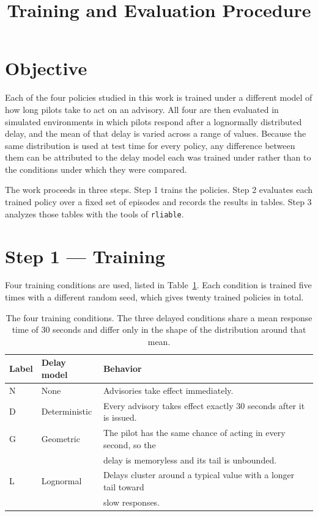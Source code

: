 \documentclass[11pt,a4paper]{article}
\title{Training and Evaluation Procedure}
\author{}
\date{}
\begin{document}
\maketitle


\section*{Objective}

Each of the four policies studied in this work is trained under a different
model of how long pilots take to act on an advisory. All four are then evaluated
in simulated environments in which pilots respond after a lognormally
distributed delay, and the mean of that delay is varied across a range of
values. Because the same distribution is used at test time for every policy, any
difference between them can be attributed to the delay model each was trained
under rather than to the conditions under which they were compared.

The work proceeds in three steps. Step 1 trains the policies. Step 2 evaluates
each trained policy over a fixed set of episodes and records the results in
tables. Step 3 analyzes those tables with the tools of \texttt{rliable}.

\section{Step 1 --- Training}

Four training conditions are used, listed in Table~\ref{tab:models}. Each
condition is trained five times with a different random seed, which gives twenty
trained policies in total.

\begin{table}[h]
\centering
\begin{tabular}{@{}lll@{}}
\toprule
Label & Delay model & Behavior \\
\midrule
N & None          & Advisories take effect immediately. \\
D & Deterministic & Every advisory takes effect exactly 30 seconds after it is issued. \\
G & Geometric     & The pilot has the same chance of acting in every second, so the \\
  &               & delay is memoryless and its tail is unbounded. \\
L & Lognormal     & Delays cluster around a typical value with a longer tail toward \\
  &               & slow responses. \\
\bottomrule
\end{tabular}
\caption{The four training conditions. The three delayed conditions share a mean
response time of 30 seconds and differ only in the shape of the distribution
around that mean.}
\label{tab:models}
\end{table}
\end{document}
